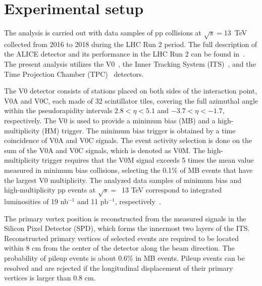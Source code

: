 

\section{Experimental setup}
\label{sec:experiment}

The analysis is carried out with data samples of pp collisions at $\sqrt{s} = 13$~TeV collected from 2016 to 2018 during the LHC Run 2 period. The full description of the ALICE detector and its performance in the LHC Run 2 can be found in~\cite{Aamodt:2008zz,Abelev:2014ffa}. The present analysis utilizes the V0~\cite{Abbas:2013taa}, the Inner Tracking System (ITS)~\cite{aliceITS}, and the Time Projection Chamber (TPC)~\cite{aliceTPC} detectors.

The V0 detector consists of stations placed on both sides of the interaction point, V0A and V0C, each made of 32 scintillator tiles, covering the full azimuthal angle within the pseudorapidity intervals $2.8 < \eta < 5.1$ and $-3.7 < \eta < -1.7$, respectively. The V0 is used to provide a minimum bias (MB) and a high-multiplicity (HM) trigger. The minimum bias trigger is obtained by a time coincidence of V0A and V0C signals. The event activity selection is done on the sum of the V0A and V0C signals, which is denoted as V0M. The high-multiplicity trigger requires that the V0M signal exceeds 5 times the mean value measured in minimum bias collisions, selecting the 0.1\% of MB events that have the largest V0 multiplicity. The analyzed data samples of minimum bias and high-multiplicity pp events at $\sqrt{s}=$~13 TeV correspond to integrated luminosities of 19 nb$^{-1}$ and 11 pb$^{-1}$, respectively~\cite{ALICE-PUBLIC-2016-002}.

The primary vertex position is reconstructed from the measured signals in the Silicon Pixel Detector (SPD), which forms the innermost two layers of the ITS. Reconstructed primary vertices of selected events are required to be located within 8 cm from the center of the detector along the beam direction. The probability of pileup events is about 0.6\% in MB events. Pileup events can be resolved and are rejected if the longitudinal displacement of their primary vertices is larger than 0.8 cm.

